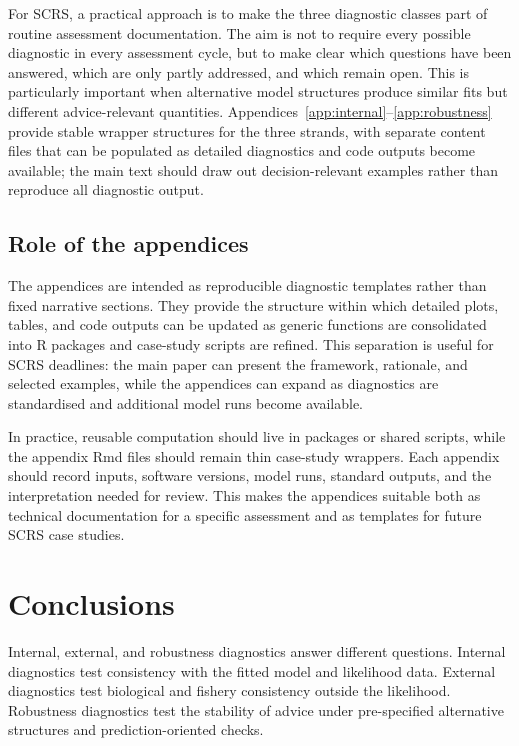 \documentclass[11pt,a4paper]{article}
\begin{document}
For SCRS, a practical approach is to make the three diagnostic classes part of routine assessment documentation. The aim is not to require every possible diagnostic in every assessment cycle, but to make clear which questions have been answered, which are only partly addressed, and which remain open. This is particularly important when alternative model structures produce similar fits but different advice-relevant quantities. Appendices~\ref{app:internal}--\ref{app:robustness} provide stable wrapper structures for the three strands, with separate content files that can be populated as detailed diagnostics and code outputs become available; the main text should draw out decision-relevant examples rather than reproduce all diagnostic output.

\subsection{Role of the appendices}

The appendices are intended as reproducible diagnostic templates rather than fixed narrative sections. They provide the structure within which detailed plots, tables, and code outputs can be updated as generic functions are consolidated into R packages and case-study scripts are refined. This separation is useful for SCRS deadlines: the main paper can present the framework, rationale, and selected examples, while the appendices can expand as diagnostics are standardised and additional model runs become available.

In practice, reusable computation should live in packages or shared scripts, while the appendix Rmd files should remain thin case-study wrappers. Each appendix should record inputs, software versions, model runs, standard outputs, and the interpretation needed for review. This makes the appendices suitable both as technical documentation for a specific assessment and as templates for future SCRS case studies.

\section{Conclusions}

Internal, external, and robustness diagnostics answer different questions. Internal diagnostics test consistency with the fitted model and likelihood data. External diagnostics test biological and fishery consistency outside the likelihood. Robustness diagnostics test the stability of advice under pre-specified alternative structures and prediction-oriented checks.
\end{document}
